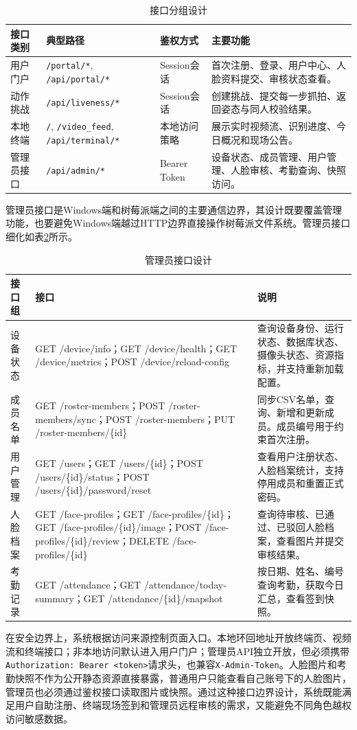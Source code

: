 \begin{table}[H]
    \centering
    \caption{接口分组设计}
    \label{tab:api_group_detail}
    \begin{tabularx}{\textwidth}{p{3cm}p{4.2cm}p{3.2cm}X}
        \toprule
        \textbf{接口类别} & \textbf{典型路径} & \textbf{鉴权方式} & \textbf{主要功能} \\
        \midrule
        用户门户 & \texttt{/portal/*}, \texttt{/api/portal/*} & Session会话 & 首次注册、登录、用户中心、人脸资料提交、审核状态查看。 \\
        动作挑战 & \texttt{/api/liveness/*} & Session会话 & 创建挑战、提交每一步抓拍、返回姿态与同人校验结果。 \\
        本地终端 & \texttt{/}, \texttt{/video\_feed}, \texttt{/api/terminal/*} & 本地访问策略 & 展示实时视频流、识别进度、今日概况和现场公告。 \\
        管理员接口 & \texttt{/api/admin/*} & Bearer Token & 设备状态、成员管理、用户管理、人脸审核、考勤查询、快照访问。 \\
        \bottomrule
    \end{tabularx}
\end{table}

管理员接口是Windows端和树莓派端之间的主要通信边界，其设计既要覆盖管理功能，也要避免Windows端越过HTTP边界直接操作树莓派文件系统。管理员接口细化如表\ref{tab:admin_api_detail_design}所示。

\begin{table}[H]
    \centering
    \caption{管理员接口设计}
    \label{tab:admin_api_detail_design}
    \begin{tabularx}{\textwidth}{p{3.4cm}p{4.6cm}X}
        \toprule
        \textbf{接口组} & \textbf{接口} & \textbf{说明} \\
        \midrule
        设备状态 & GET /device/info；GET /device/health；GET /device/metrics；POST /device/reload-config & 查询设备身份、运行状态、数据库状态、摄像头状态、资源指标，并支持重新加载配置。 \\
        成员名单 & GET /roster-members；POST /roster-members/sync；POST /roster-members；PUT /roster-members/\{id\} & 同步CSV名单，查询、新增和更新成员。成员编号用于约束首次注册。 \\
        用户管理 & GET /users；GET /users/\{id\}；POST /users/\{id\}/status；POST /users/\{id\}/password/reset & 查看用户注册状态、人脸档案统计，支持停用成员和重置正式密码。 \\
        人脸档案 & GET /face-profiles；GET /face-profiles/\{id\}；GET /face-profiles/\{id\}/image；POST /face-profiles/\{id\}/review；DELETE /face-profiles/\{id\} & 查询待审核、已通过、已驳回人脸档案，查看图片并提交审核结果。 \\
        考勤记录 & GET /attendance；GET /attendance/today-summary；GET /attendance/\{id\}/snapshot & 按日期、姓名、编号查询考勤，获取今日汇总，查看签到快照。 \\
        \bottomrule
    \end{tabularx}
\end{table}

在安全边界上，系统根据访问来源控制页面入口。本地环回地址开放终端页、视频流和终端接口；非本地访问默认进入用户门户；管理员API独立开放，但必须携带\texttt{Authorization: Bearer <token>}请求头，也兼容\texttt{X-Admin-Token}。人脸图片和考勤快照不作为公开静态资源直接暴露，普通用户只能查看自己账号下的人脸图片，管理员也必须通过鉴权接口读取图片或快照。通过这种接口边界设计，系统既能满足用户自助注册、终端现场签到和管理员远程审核的需求，又能避免不同角色越权访问敏感数据。
